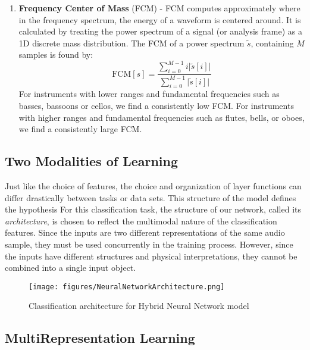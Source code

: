 \documentclass[conference,twocolumn,letterpaper]{IEEEtran}
\begin{document}
\begin{enumerate}
\item\textbf{Frequency Center of Mass} (FCM) - 
FCM computes approximately where in the frequency spectrum, the energy of a waveform is centered around. It is calculated by treating the power spectrum of a signal (or analysis frame) as a 1D discrete mass distribution. The FCM of a power spectrum $\widetilde{s}$, containing $M$ samples is found by:
\begin{equation}
    \label{eqn:FCM}
    \text{FCM}[s] = 
    \frac{\sum_{i=0}^{M-1}i\big|\widetilde{s}[i]\big|}
    {\sum_{i=0}^{M-1}\big|\widetilde{s}[i]\big|}
\end{equation}
For instruments with lower ranges and fundamental frequencies such as basses, bassoons or cellos, we find a consistently low FCM. For instruments with higher ranges and fundamental frequencies such as flutes, bells, or oboes, we find a consistently large FCM.

\end{enumerate}


\subsection{Two Modalities of Learning}
\label{subsec:two modes}

Just like the choice of features, the choice and organization of layer functions can differ drastically between tasks or data sets. This structure of the model defines the hypothesis For this classification task, the structure of our network, called its \textit{architecture}, is chosen to reflect the multimodal nature of the classification features. Since the inputs are two different representations of the same audio sample, they must be used concurrently in the training process. However, since the inputs have different structures and physical interpretations, they cannot be combined into a single input object.

\begin{figure}[h]
    \centering
    \texttt{[image: figures/NeuralNetworkArchitecture.png]}
    \caption{Classification architecture for Hybrid Neural Network model}
    \label{fig:Architecture}
\end{figure}


\subsection{MultiRepresentation Learning}
\label{subsec:Multimodal}
\end{document}
